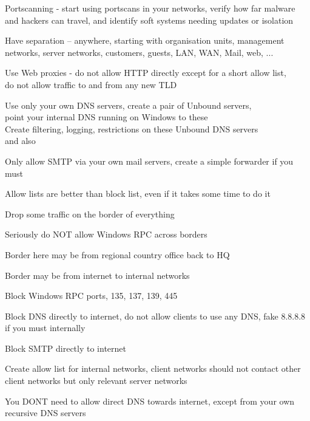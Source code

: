\documentclass[Screen16to9,17pt]{foils}
\begin{document}
\begin{list2}
\item Portscanning - start using portscans in your networks, verify how far malware and hackers can travel, and identify soft systems needing updates or isolation
\item Have separation -- anywhere, starting with organisation units, management networks, server networks, customers, guests, LAN, WAN, Mail, web, ...
\item Use Web proxies - do not allow HTTP directly except for a short allow list, \\
do not allow traffic to and from any new TLD
\item Use only your own DNS servers, create a pair of Unbound servers, \\
point your internal DNS running on Windows to these\\
Create filtering, logging, restrictions on these Unbound DNS servers\\
 and also 
\item Only allow SMTP via your own mail servers, create a simple forwarder if you must
\end{list2}

Allow lists are better than block list, even if it takes some time to do it



\begin{list2}
\item Drop some traffic on the border of everything
\item Seriously do NOT allow Windows RPC across borders
\item Border here may be from regional country office back to HQ
\item Border may be from internet to internal networks
\item Block Windows RPC ports, 135, 137, 139, 445
\item Block DNS directly to internet, do not allow clients to use any DNS, fake 8.8.8.8 if you must internally
\item Block SMTP directly to internet
\item Create allow list for internal networks, client networks should not contact other client networks but only relevant server networks
\end{list2}

You DONT need to allow direct DNS towards internet, except from your own recursive DNS servers
\end{document}
